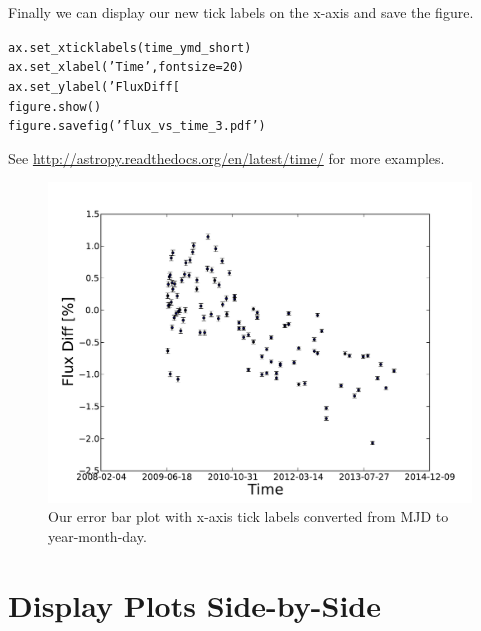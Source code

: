 Finally we can display our new tick labels on the x-axis and save the figure.

\begin{alltt}
\pytab ax.set\_xticklabels(time\_ymd\_short)
\pytab ax.set\_xlabel('Time', fontsize=20)
\pytab ax.set\_ylabel('Flux Diff [%
\pytab figure.show()
\pytab figure.savefig('flux_vs_time_3.pdf')
\end{alltt}

See \href{http://astropy.readthedocs.org/en/latest/time/}{http://astropy.readthedocs.org/en/latest/time/} for more examples.

\begin{figure}[tbp]
  \centering
    \includegraphics[scale=0.55]{flux_vs_time_3.pdf}
    \caption{Our error bar plot with x-axis tick labels converted from MJD to year-month-day.}
  \label{fig:flux_vs_time_3}
\end{figure}




\section{Display Plots Side-by-Side}


